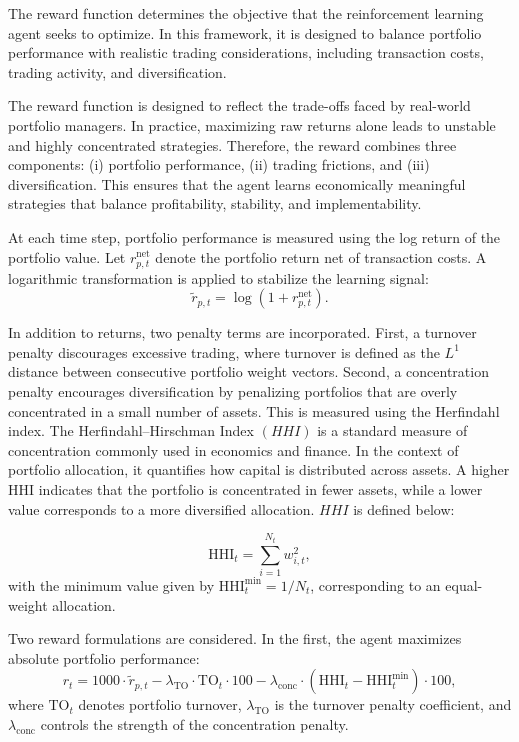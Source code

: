 \documentclass[]{elsarticle}
\begin{document}
The reward function determines the objective that the reinforcement learning agent seeks to optimize. In this framework, it is designed to balance portfolio performance with realistic trading considerations, including transaction costs, trading activity, and diversification.

The reward function is designed to reflect the trade-offs faced by real-world portfolio managers. In practice, maximizing raw returns alone leads to unstable and highly concentrated strategies. Therefore, the reward combines three components: (i) portfolio performance, (ii) trading frictions, and (iii) diversification. This ensures that the agent learns economically meaningful strategies that balance profitability, stability, and implementability.

At each time step, portfolio performance is measured using the log return of the portfolio value. Let \(r^{\text{net}}_{p,t}\) denote the portfolio return net of transaction costs. A logarithmic transformation is applied to stabilize the learning signal:
\begin{equation}
\tilde{r}_{p,t} = \log(1 + r^{\text{net}}_{p,t}).
\end{equation}

In addition to returns, two penalty terms are incorporated. First, a turnover penalty discourages excessive trading, where turnover is defined as the $L^1$ distance between consecutive portfolio weight vectors. Second, a concentration penalty encourages diversification by penalizing portfolios that are overly concentrated in a small number of assets. This is measured using the Herfindahl index. The Herfindahl–Hirschman Index \((HHI)\) is a standard measure of concentration commonly used in economics and finance. In the context of portfolio allocation, it quantifies how capital is distributed across assets. A higher HHI indicates that the portfolio is concentrated in fewer assets, while a lower value corresponds to a more diversified allocation. \(HHI\) is defined below:

\begin{equation}
\text{HHI}_t = \sum_{i=1}^{N_t} w_{i,t}^2,
\end{equation}
with the minimum value given by \(\text{HHI}^{\min}_t = 1 / N_t\), corresponding to an equal-weight allocation.

Two reward formulations are considered. In the first, the agent maximizes absolute portfolio performance:
\begin{equation}
r_t = 1000 \cdot \tilde{r}_{p,t}
- \lambda_{\text{TO}} \cdot \text{TO}_t \cdot 100
- \lambda_{\text{conc}} \cdot (\text{HHI}_t - \text{HHI}^{\min}_t) \cdot 100,
\end{equation}
where \(\text{TO}_t\) denotes portfolio turnover, \(\lambda_{\text{TO}}\) is the turnover penalty coefficient, and \(\lambda_{\text{conc}}\) controls the strength of the concentration penalty.
\end{document}
